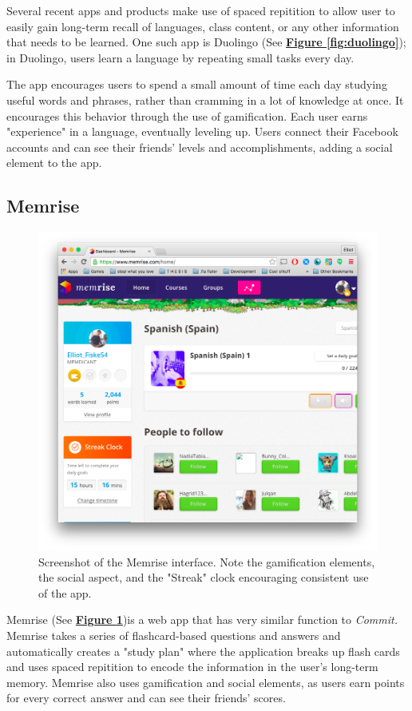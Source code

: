 \par Several recent apps and products make use of spaced repitition to allow user to easily gain long-term recall of languages, class content, or any other information that needs to be learned. One such app is Duolingo (See \textbf{\hyperref[fig:duolingo]{Figure \ref*{fig:duolingo}}}); in Duolingo, users learn a language by repeating small tasks every day. 

\par The app encourages users to spend a small amount of time each day studying useful words and phrases, rather than cramming in a lot of knowledge at once. It encourages this behavior through the use of gamification. Each user earns "experience" in a language, eventually leveling up. Users connect their Facebook accounts and can see their friends' levels and accomplishments, adding a social element to the app.

\subsection{Memrise}

\begin{figure}
	\centering
	\includegraphics[width=0.7\linewidth]{memrise}
	\caption[Memrise]{Screenshot of the Memrise interface. Note the gamification elements, the social aspect, and the "Streak" clock encouraging consistent use of the app.}
	\label{fig:memrise}
\end{figure}

\par Memrise (See \textbf{\hyperref[fig:memrise]{Figure \ref*{fig:memrise}}})is a web app that has very similar function to \textit{Commit.} Memrise takes a series of flashcard-based questions and answers and automatically creates a "study plan" where the application breaks up flash cards and uses spaced repitition to encode the information in the user's long-term memory. Memrise also uses gamification and social elements, as users earn points for every correct answer and can see their friends' scores.

